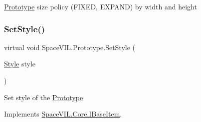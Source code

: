 \mbox{\hyperlink{class_space_v_i_l_1_1_prototype}{Prototype}} size policy (F\+I\+X\+ED, E\+X\+P\+A\+ND) by width and height 

\mbox{\label{class_space_v_i_l_1_1_prototype_ae96644a6ace490afb376fb542161e541}} 
\subsubsection{\texorpdfstring{Set\+Style()}{SetStyle()}}
{\footnotesize\ttfamily virtual void Space\+V\+I\+L.\+Prototype.\+Set\+Style (\begin{DoxyParamCaption}\item[{\mbox{\hyperlink{class_space_v_i_l_1_1_decorations_1_1_style}{Style}}}]{style }\end{DoxyParamCaption})\hspace{0.3cm}{\ttfamily [virtual]}}



Set style of the \mbox{\hyperlink{class_space_v_i_l_1_1_prototype}{Prototype}} 



Implements \mbox{\hyperlink{interface_space_v_i_l_1_1_core_1_1_i_base_item}{Space\+V\+I\+L.\+Core.\+I\+Base\+Item}}.



